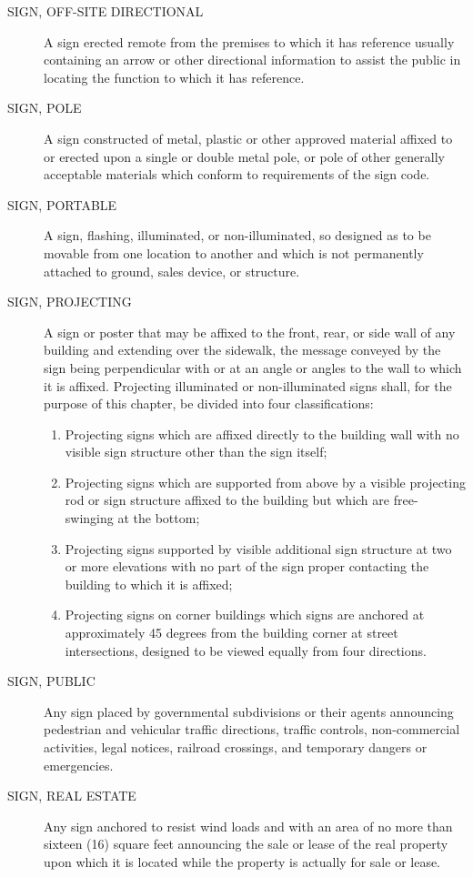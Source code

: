 \begin{description}
    \item[SIGN, OFF-SITE DIRECTIONAL] A sign erected remote from the premises to which it has reference usually containing an arrow or other directional information to assist the public in locating the function to which it has reference.
    \item[SIGN, POLE] A sign constructed of metal, plastic or other approved material affixed to or erected upon a single or double metal pole, or pole of other generally acceptable materials which conform to requirements of the sign code.
    \item[SIGN, PORTABLE] A sign, flashing, illuminated, or non-illuminated, so designed as to be movable from one location to another and which is not permanently attached to ground, sales device, or structure.
    \item[SIGN, PROJECTING] A sign or poster that may be affixed to the front, rear, or side wall of any building and extending over the sidewalk, the message conveyed by the sign being perpendicular with or at an angle or angles to the wall to which it is affixed.  Projecting illuminated or non-illuminated signs shall, for the purpose of this chapter, be divided into four classifications:
        \begin{enumerate}
            \item Projecting signs which are affixed directly to the building wall with no visible sign structure other than the sign itself;
            \item Projecting signs which are supported from above by a visible projecting rod or sign structure affixed to the building but which are free-swinging at the bottom;
            \item Projecting signs supported by visible additional sign structure at two or more elevations with no part of the sign proper contacting the building to which it is affixed;
            \item Projecting signs on corner buildings which signs are anchored at approximately 45 degrees from the building corner at street intersections, designed to be viewed equally from four directions.
        \end{enumerate}
    \item[SIGN, PUBLIC] Any sign placed by governmental subdivisions or their agents announcing pedestrian and vehicular traffic directions, traffic controls, non-commercial activities, legal notices, railroad crossings, and temporary dangers or emergencies.
    \item[SIGN, REAL ESTATE] Any sign anchored to resist wind loads and with an area of no more than sixteen (16) square feet announcing the sale or lease of the real property upon which it is located while the property is actually for sale or lease.

\end{description}
